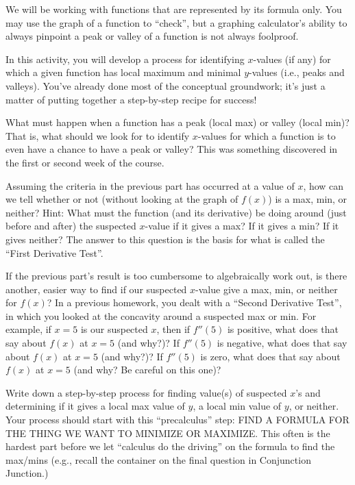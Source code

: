 \documentclass[handout]{ximera}
\begin{document}
We will be working with functions that are represented by its formula only.  You may use the graph of a function to ``check'', but a graphing calculator's ability to always pinpoint a peak or valley of a function is not always foolproof.

In this activity, you will develop a process for identifying $x$-values (if any) for which a given function has local maximum and minimal $y$-values (i.e., peaks and valleys).  You've already done most of the conceptual groundwork; it's just a matter of putting together a step-by-step recipe for success!

\begin{exploration} 
What must happen when a function  has a peak (local max) or valley (local min)?  That is, what should we look for to identify $x$-values for which a function is to even have a chance to have a peak or valley?  This was something discovered in the first or second week of the course.
\end{exploration}
\begin{exploration}
Assuming the criteria in the previous part has occurred at a value of $x$, how can we tell whether or not (without looking at the graph of  $f(x)$) is a max, min, or neither?  Hint:  What must the function (and its derivative) be doing around (just before and after) the suspected $x$-value if it gives a max?  If it gives a min?  If it gives neither?  The answer to this question is the basis for what is called the ``First Derivative Test''. 
\end{exploration}	
\begin{exploration} 
If the previous part's result is too cumbersome to algebraically work out, is there another, easier way to find if our suspected $x$-value give a max, min, or neither for $f(x)$?  In a previous homework, you dealt with a ``Second Derivative Test'', in which you looked at the concavity around a suspected max or min.  For example, if $x = 5$ is our suspected $x$, then if $f''(5)$ is positive, what does that say about $f(x)$ at $x = 5$ (and why?)?  If $f''(5)$ is negative, what does that say about $f(x)$ at $x = 5$ (and why?)?  If $f''(5)$ is zero, what does that say about $f(x)$ at $x = 5$ (and why? Be careful on this one)?  
\end{exploration}
\begin{exploration} 
Write down a step-by-step process for finding value(s) of suspected $x$'s and determining if it gives a local max value of $y$, a local min value of $y$, or neither.  Your process should start with this ``precalculus'' step:  FIND A FORMULA FOR THE THING WE WANT TO MINIMIZE OR MAXIMIZE.  This often is the hardest part before we let ``calculus do the driving'' on the formula to find the max/mins (e.g., recall the container on the final question in Conjunction Junction.)
\end{exploration}
\end{document}
